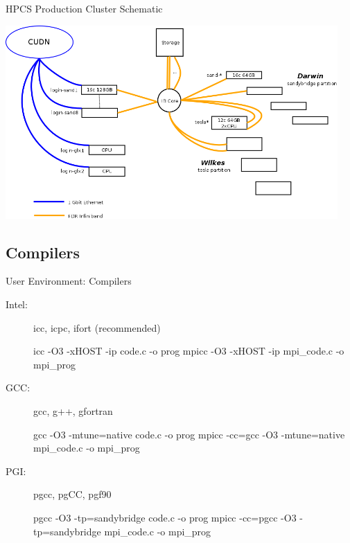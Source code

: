 \begin{frame}{HPCS Production Cluster Schematic}
\centerline{\includegraphics[width=0.95\textwidth]{imgs/cluster.png}}%
\end{frame}


\subsection{Compilers}
\begin{frame}[fragile]{User Environment: Compilers}
\begin{description}
\item[Intel:]{\alert{icc}, \alert{icpc}, \alert{ifort} (recommended)}
\begin{semiverbatim}
\scriptsize
icc -O3 -xHOST -ip code.c -o prog
mpicc -O3 -xHOST -ip mpi_code.c -o mpi_prog
\end{semiverbatim}
\smallskip
\item[GCC:]{\alert{gcc}, \alert{g++}, \alert{gfortran}}
\begin{semiverbatim}
\scriptsize
gcc -O3 -mtune=native code.c -o prog
mpicc -cc=gcc -O3 -mtune=native mpi_code.c -o mpi_prog
\end{semiverbatim}
\smallskip
\item[PGI:]{\alert{pgcc}, \alert{pgCC}, \alert{pgf90}}
\begin{semiverbatim}
\scriptsize
pgcc -O3 -tp=sandybridge code.c -o prog
mpicc -cc=pgcc -O3 -tp=sandybridge mpi_code.c -o mpi_prog
\end{semiverbatim}
\pause
\end{description}
\end{frame}

